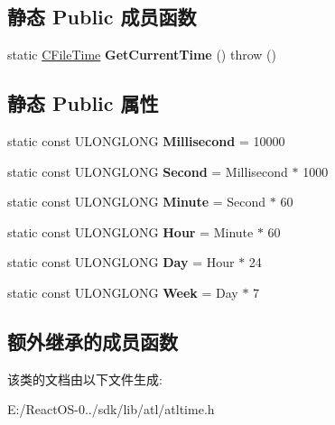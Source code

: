 \subsection*{静态 Public 成员函数}
\begin{DoxyCompactItemize}
\item 
\mbox{\label{class_a_t_l_1_1_c_file_time_aa03ca07c3f7a1130683ed246570b031e}} 
static \hyperlink{class_a_t_l_1_1_c_file_time}{C\+File\+Time} {\bfseries Get\+Current\+Time} ()  throw ()
\end{DoxyCompactItemize}
\subsection*{静态 Public 属性}
\begin{DoxyCompactItemize}
\item 
\mbox{\label{class_a_t_l_1_1_c_file_time_aec17d73083b9701b21bd80e27264eb93}} 
static const U\+L\+O\+N\+G\+L\+O\+NG {\bfseries Millisecond} = 10000
\item 
\mbox{\label{class_a_t_l_1_1_c_file_time_a4588bfc190579a0d75248dcde7a69d98}} 
static const U\+L\+O\+N\+G\+L\+O\+NG {\bfseries Second} = Millisecond $\ast$ 1000
\item 
\mbox{\label{class_a_t_l_1_1_c_file_time_a829f216c2810762a7090a85497011f7e}} 
static const U\+L\+O\+N\+G\+L\+O\+NG {\bfseries Minute} = Second $\ast$ 60
\item 
\mbox{\label{class_a_t_l_1_1_c_file_time_a2bec54cf19a1fbb9f4793b3a43177a4d}} 
static const U\+L\+O\+N\+G\+L\+O\+NG {\bfseries Hour} = Minute $\ast$ 60
\item 
\mbox{\label{class_a_t_l_1_1_c_file_time_a83575237676523d7adcf7251bb1a129b}} 
static const U\+L\+O\+N\+G\+L\+O\+NG {\bfseries Day} = Hour $\ast$ 24
\item 
\mbox{\label{class_a_t_l_1_1_c_file_time_af4ac6223626401ca9d9952f3adc2743b}} 
static const U\+L\+O\+N\+G\+L\+O\+NG {\bfseries Week} = Day $\ast$ 7
\end{DoxyCompactItemize}
\subsection*{额外继承的成员函数}


该类的文档由以下文件生成\+:\begin{DoxyCompactItemize}
\item 
E\+:/\+React\+O\+S-\/0../sdk/lib/atl/atltime.\+h\end{DoxyCompactItemize}

